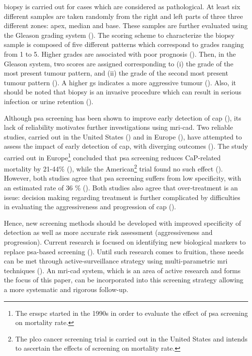  biopsy is carried out for cases which are considered as pathological. At least six different samples are taken randomly from the right and left parts of three three different zones: apex, median and base. These samples are further evaluated using the Gleason grading system (\cite{Gleason1977}). The scoring scheme to characterize the biopsy sample is composed of five different patterns which correspond to grades ranging from 1 to 5. Higher grades are associated with poor prognosis (\cite{Epstein2005}). Then, in the Gleason system, two scores are assigned corresponding to (i) the grade of the most present tumour pattern, and (ii) the grade of the second most present tumour pattern (\cite{Epstein2005}). A higher \ac{gs} indicates a more aggressive tumour (\cite{Epstein2005}). Also, it should be noted that biopsy is an invasive procedure which can result in serious infection or urine retention (\cite{Hara2005,Chou2011}).

Although \ac{psa} screening has been shown to improve early detection of \ac{cap} (\cite{Chou2011}), its lack of reliability motivates further investigations using \ac{mri}-\ac{cad}. Two reliable studies, carried out in the United States (\cite{Andriole2009}) and in Europe (\cite{Schroeder2012, Hugosson2010}), have attempted to assess the impact of early detection of \ac{cap}, with diverging outcomes (\cite{Chou2011,Heidenreich2013}). The study carried out in Europe\footnote{The \ac{ersspc}  started in the 1990s in order to evaluate the effect of \ac{psa} screening on mortality rate.} concluded that \ac{psa} screening reduces CaP-related mortality by 21-44\% (\cite{Schroeder2012, Hugosson2010}), while the American\footnote{The \ac{plco} cancer screening trial is carried out in the United States and intends to ascertain the effects of screening on mortality rate.} trial found no such effect (\cite{Andriole2009}). However, both studies agree that \ac{psa} screening suffers from low specificity, with an estimated rate of 36 \% (\cite{Schroder2008}). Both studies also agree that over-treatment is an issue: decision making regarding treatment is further complicated by difficulties in evaluating the aggressiveness and progression of \ac{cap} (\cite{Delpierre2013}). 

Hence, new screening methods should be developed with improved specificity of detection as well as more accurate risk assessment (aggressiveness and progression). Current research is focused on identifying new biological markers to replace \ac{psa}-based screening (\cite{Bourdoumis2010,Morgan2011,Brenner2013}). Until such research comes to fruition, these needs can be met through active-surveillance strategy using multi-parametric \ac{mri} techniques (\cite{Hoeks2011,Moore2013}). An \ac{mri}-\acs{cad} system, which is an area of active research and forms the focus of this paper, can be incorporated into this screening strategy allowing a more systematic and rigorous follow-up.


